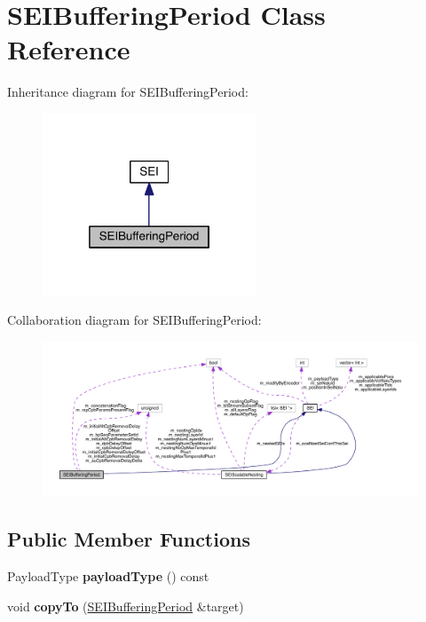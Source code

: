 \hypertarget{class_s_e_i_buffering_period}{}\section{S\+E\+I\+Buffering\+Period Class Reference}
\label{class_s_e_i_buffering_period}


Inheritance diagram for S\+E\+I\+Buffering\+Period\+:
\nopagebreak
\begin{figure}[H]
\begin{center}
\leavevmode
\includegraphics[width=181pt]{df/dca/class_s_e_i_buffering_period__inherit__graph}
\end{center}
\end{figure}


Collaboration diagram for S\+E\+I\+Buffering\+Period\+:
\nopagebreak
\begin{figure}[H]
\begin{center}
\leavevmode
\includegraphics[width=350pt]{da/d65/class_s_e_i_buffering_period__coll__graph}
\end{center}
\end{figure}
\subsection*{Public Member Functions}
\begin{DoxyCompactItemize}
\item 
\mbox{\label{class_s_e_i_buffering_period_ad79f6da92577c4457fe229f1e0e87331}} 
Payload\+Type {\bfseries payload\+Type} () const
\item 
\mbox{\label{class_s_e_i_buffering_period_a54a904c09b35ffdf6739c7523a9b0582}} 
void {\bfseries copy\+To} (\hyperlink{class_s_e_i_buffering_period}{S\+E\+I\+Buffering\+Period} \&target)
\end{DoxyCompactItemize}
